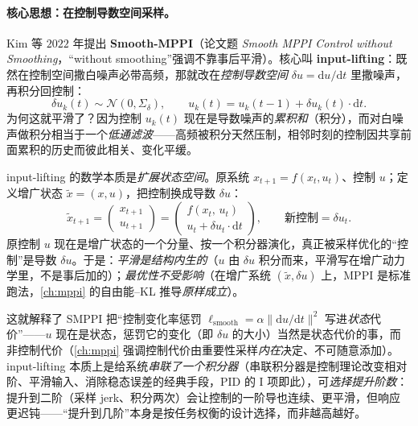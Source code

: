 \paragraph{核心思想：在控制导数空间采样。}
Kim 等 $2022$ 年提出 \textbf{Smooth-MPPI}（论文题 \emph{Smooth MPPI Control without Smoothing}，“without smoothing”强调不靠事后平滑）\cite{kim2022smooth}。核心叫 \textbf{input-lifting}：既然在控制空间撒白噪声必带高频，那就改在\emph{控制导数空间} $\delta u=\mathrm{d}u/\mathrm{d}t$ 里撒噪声，再积分回控制：
\begin{equation}
  \delta u_k(t)\sim\mathcal{N}(0,\Sigma_\delta),\qquad u_k(t)=u_k(t{-}1)+\delta u_k(t)\cdot\mathrm{d}t.
  \label{eq:mv-inputlift}
\end{equation}
为何这就平滑了？因为控制 $u_k(t)$ 现在是导数噪声的\emph{累积和}（积分），而对白噪声做积分相当于一个\emph{低通滤波}——高频被积分天然压制，相邻时刻的控制因共享前面累积的历史而彼此相关、变化平缓。

\begin{theorem}\label{thm:mv-lift}
input-lifting 的数学本质是\emph{扩展状态空间}\cite{kim2022smooth}。原系统 $x_{t+1}=f(x_t,u_t)$、控制 $u$；定义增广状态 $\tilde{x}=(x,u)$，把控制换成导数 $\delta u$：
\begin{equation}
  \tilde{x}_{t+1}=\begin{pmatrix}x_{t+1}\\ u_{t+1}\end{pmatrix}
  =\begin{pmatrix}f(x_t,\,u_t)\\ u_t+\delta u_t\cdot\mathrm{d}t\end{pmatrix},\qquad \text{新控制}=\delta u_t.
  \label{eq:mv-lift-aug}
\end{equation}
原控制 $u$ 现在是增广状态的一个分量、按一个积分器演化，真正被采样优化的“控制”是导数 $\delta u$。于是：\emph{平滑是结构内生的}（$u$ 由 $\delta u$ 积分而来，平滑写在增广动力学里，不是事后加的）；\emph{最优性不受影响}（在增广系统 $(\tilde{x},\delta u)$ 上，MPPI 是标准跑法，\cref{ch:mppi} 的自由能--KL 推导\emph{原样成立}）。
\end{theorem}

\noindent 这就解释了 SMPPI 把“控制变化率惩罚 $\ell_{\text{smooth}}=\alpha\|\mathrm{d}u/\mathrm{d}t\|^2$ 写进\emph{状态}代价”——$u$ 现在是状态，惩罚它的变化（即 $\delta u$ 的大小）当然是状态代价的事，而非控制代价（\cref{ch:mppi} 强调控制代价由重要性采样\emph{内在}决定、不可随意添加）。input-lifting 本质上是给系统\emph{串联了一个积分器}（串联积分器是控制理论改变相对阶、平滑输入、消除稳态误差的经典手段，PID 的 I 项即此），可\emph{选择提升阶数}：提升到二阶（采样 jerk、积分两次）会让控制的一阶导也连续、更平滑，但响应更迟钝——“提升到几阶”本身是按任务权衡的设计选择，而非越高越好。


